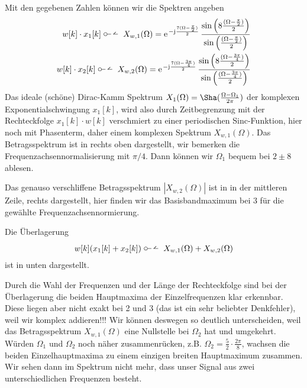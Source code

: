 %
\begin{Loesung}
Mit den gegebenen Zahlen können wir die Spektren angeben
\begin{align}
w[k] \cdot x_1[k]\dtft
X_{w,1}(\Omega) = \e^{-\im\frac{7(\Omega-\frac{\pi}{2})}{2}}\,
\frac{\sin\left(8\frac{(\Omega-\frac{\pi}{2})}{2}\right)}{\sin\left(\frac{(\Omega-\frac{\pi}{2})}{2}\right)}
%
\\
w[k] \cdot x_2[k]\dtft
X_{w,2}(\Omega) = \e^{-\im\frac{7(\Omega-\frac{3\pi}{4})}{2}}\,
\frac{\sin\left(8\frac{(\Omega-\frac{3\pi}{4})}{2}\right)}{\sin\left(\frac{(\Omega-\frac{3\pi}{4})}{2}\right)}
\end{align}
%
Das ideale (schöne) Dirac-Kamm Spektrum $X_1(\Omega)=\Sha(\frac{\Omega-\Omega_1}{2\pi})$
der komplexen Exponentialschwingung $x_1[k]$, wird also durch
Zeitbegrenzung mit der Rechteckfolge $x_1[k]\cdot w[k]$ verschmiert zu einer periodischen Sinc-Funktion,
hier noch mit Phasenterm, daher einem komplexen Spektrum $X_{w,1}(\Omega)$.
%
Das Betragsspektrum ist in  rechts oben dargestellt,
wir bemerken die Frequenzachsennormalisierung mit $\pi/4$. Dann können wir
$\Omega_1$ bequem bei $2 \pm 8$ ablesen.

Das genauso verschliffene Betragsspektrum $|X_{w,2}(\Omega)|$ ist in  in der mittleren Zeile, rechts
dargestellt, hier finden wir das Basisbandmaximum bei $3$ für die gewählte Frequenzachsennormierung.

Die Überlagerung
\begin{align}
w[k](x_1[k]+x_2[k]) \dtft   X_{w,1}(\Omega) + X_{w,2}(\Omega)
\end{align}
ist in  unten dargestellt.

Durch die Wahl der Frequenzen und der Länge der Rechteckfolge
sind bei der Überlagerung die beiden Hauptmaxima der Einzelfrequenzen klar erkennbar.
Diese liegen aber nicht exakt bei 2 und 3 (das ist ein sehr beliebter Denkfehler),
weil wir komplex addieren!!! Wir können
deswegen so deutlich unterscheiden, weil das Betragsspektrum
$X_{w,1}(\Omega)$ eine Nullstelle bei $\Omega_2$ hat und umgekehrt.
Würden $\Omega_1$ und $\Omega_2$ noch näher zusammenrücken, z.B. $\Omega_2=\frac{5}{2}\cdot\frac{2\pi}{8}$,
wachsen die beiden Einzelhauptmaxima zu einem einzigen breiten Hauptmaximum zusammen.
Wir sehen dann im Spektrum nicht mehr, dass unser Signal aus zwei unterschiedlichen Frequenzen besteht.
%
\end{Loesung}

